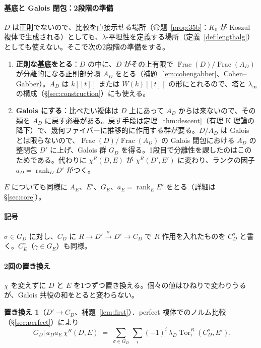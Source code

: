 \documentclass[11pt,a4paper]{ltjsarticle}
\numberwithin{equation}{section}
\theoremstyle{plain}
\theoremstyle{definition}
\theoremstyle{definition}
\newcommand{\Tor}{\operatorname{Tor}}
\newcommand{\rank}{\operatorname{rank}}
\newcommand{\Frac}{\operatorname{Frac}}
\begin{document}
\paragraph{基底と Galois 閉包：2段階の準備}
$D$ は正則でないので、比較を直接示せる場所（命題~\ref{prop:35b}：$K_0$ が Koszul 複体で生成される）としても、$\lambda$-平坦性を定義する場所（定義~\ref{def:lengthalg}）としても使えない。そこで次の2段階の準備をする。
\begin{enumerate}
  \item \textbf{正則な基底をとる}：$D$ の中に、$D$ がその上有限で $\Frac(D)/\Frac(A_D)$ が分離的になる正則部分環 $A_D$ をとる（補題~\ref{lem:cohengabber}、Cohen--Gabber）。$A_D$ は $k[[t]]$ または $W(k)[[t]]$ の形にとれるので、塔と $\lambda_\infty$ の構成（§\ref{sec:construction}）にも使える。
  \item \textbf{Galois にする}：比べたい複体は $D$ 上にあって $A_D$ からは来ないので、その類を $A_D$ に戻す必要がある。戻す手段は定理~\ref{thm:descent}（有理 K 理論の降下）で、幾何ファイバーに推移的に作用する群が要る。$D/A_D$ は Galois とは限らないので、$\Frac(D)/\Frac(A_D)$ の Galois 閉包における $A_D$ の整閉包 $D'$ に上げ、Galois 群 $G_D$ を得る。1段目で分離性を課したのはこのためである。代わりに $\chi^R(D,E)$ が $\chi^R(D',E')$ に変わり、ランクの因子 $a_D = \rank_D D'$ がつく。
\end{enumerate}
$E$ についても同様に $A_E$、$E'$、$G_E$、$a_E = \rank_E E'$ をとる（詳細は §\ref{sec:core}）。

\paragraph{記号}
$\sigma\in G_D$ に対し、$C_D$ に $R\to D'\xrightarrow{\sigma}D'\to C_D$ で $R$ 作用を入れたものを $C_D^\sigma$ と書く。$C_E^\gamma$（$\gamma\in G_E$）も同様。

\paragraph{2回の置き換え}
$\chi$ を変えずに $D$ と $E$ を1つずつ置き換える。個々の値はひねりで変わりうるが、Galois 共役の和をとると変わらない。

\textbf{置き換え 1}（$D'\to C_D$、補題~\ref{lem:first}）．perfect 複体でのノルム比較（§\ref{sec:perfect}）により
\begin{equation}\label{eq:strategy1}
  |G_D|\, a_D a_E\, \chi^R(D,E) \;=\; \sum_{\sigma\in G_D}\, \sum_i (-1)^i\, \lambda_D \Tor_i^R(C_D^\sigma, E').
\end{equation}
\end{document}
